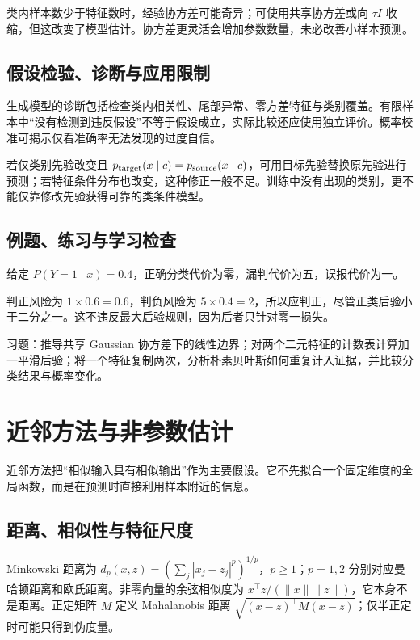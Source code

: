 \documentclass[UTF8,12pt,a4paper,fontset=fandol]{ctexbook}
\begin{document}
类内样本数少于特征数时，经验协方差可能奇异；可使用共享协方差或向 $\tau I$ 收缩，但这改变了模型估计。协方差更灵活会增加参数数量，未必改善小样本预测。

\section{假设检验、诊断与应用限制}

生成模型的诊断包括检查类内相关性、尾部异常、零方差特征与类别覆盖。有限样本中“没有检测到违反假设”不等于假设成立，实际比较还应使用独立评价。概率校准可揭示仅看准确率无法发现的过度自信。

若仅类别先验改变且 $p_{\rm target}(x\mid c)=p_{\rm source}(x\mid c)$，可用目标先验替换原先验进行预测；若特征条件分布也改变，这种修正一般不足。训练中没有出现的类别，更不能仅靠修改先验获得可靠的类条件模型。

\section{例题、练习与学习检查}

\begin{example}[代价改变决策]
给定 $P(Y=1\mid x)=0.4$，正确分类代价为零，漏判代价为五，误报代价为一。
\end{example}
\begin{solve}
判正风险为 $1\times0.6=0.6$，判负风险为 $5\times0.4=2$，所以应判正，尽管正类后验小于二分之一。这不违反最大后验规则，因为后者只针对零一损失。
\end{solve}

习题：推导共享 Gaussian 协方差下的线性边界；对两个二元特征的计数表计算加一平滑后验；将一个特征复制两次，分析朴素贝叶斯如何重复计入证据，并比较分类结果与概率变化。

\chapter{近邻方法与非参数估计}
\label{chap:ml-neighbors}

近邻方法把“相似输入具有相似输出”作为主要假设。它不先拟合一个固定维度的全局函数，而是在预测时直接利用样本附近的信息。

\section{距离、相似性与特征尺度}

Minkowski 距离为 $d_p(x,z)=(\sum_j|x_j-z_j|^p)^{1/p}$，$p\geq1$；$p=1,2$ 分别对应曼哈顿距离和欧氏距离。非零向量的余弦相似度为 $x^\top z/(\|x\|\|z\|)$，它本身不是距离。正定矩阵 $M$ 定义 Mahalanobis 距离 $\sqrt{(x-z)^\top M(x-z)}$；仅半正定时可能只得到伪度量。
\end{document}
